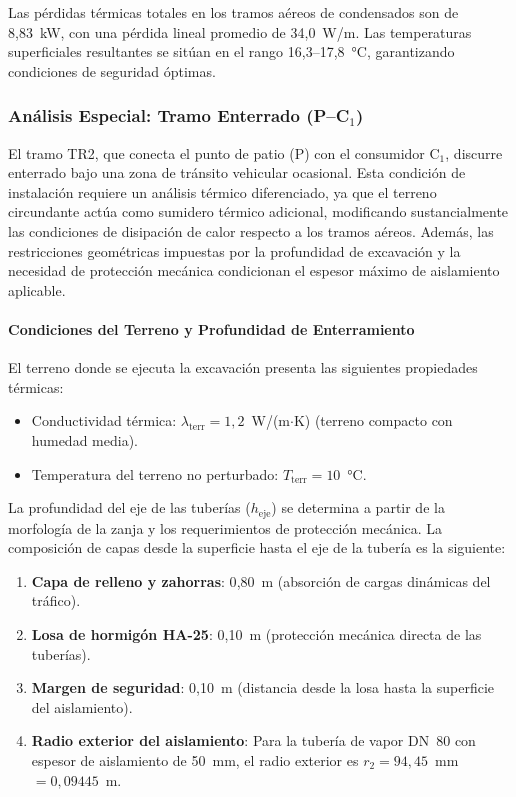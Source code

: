 Las pérdidas térmicas totales en los tramos aéreos de condensados son de 8{,}83~kW, con una pérdida lineal promedio de 34{,}0~W/m. Las temperaturas superficiales resultantes se sitúan en el rango 16{,}3--17{,}8~°C, garantizando condiciones de seguridad óptimas.


\subsubsection{Análisis Especial: Tramo Enterrado (P--C$_1$)}
\label{subsubsec:tramo_enterrado}

El tramo TR2, que conecta el punto de patio (P) con el consumidor C$_1$, discurre enterrado bajo una zona de tránsito vehicular ocasional. Esta condición de instalación requiere un análisis térmico diferenciado, ya que el terreno circundante actúa como sumidero térmico adicional, modificando sustancialmente las condiciones de disipación de calor respecto a los tramos aéreos. Además, las restricciones geométricas impuestas por la profundidad de excavación y la necesidad de protección mecánica condicionan el espesor máximo de aislamiento aplicable.

\paragraph{Condiciones del Terreno y Profundidad de Enterramiento}
\label{par:condiciones_terreno}

El terreno donde se ejecuta la excavación presenta las siguientes propiedades térmicas:

\begin{itemize}[noitemsep]
	\item Conductividad térmica: $\lambda_{\text{terr}} = 1{,}2$~W/(m$\cdot$K) (terreno compacto con humedad media).
	\item Temperatura del terreno no perturbado: $T_{\text{terr}} = 10$~°C.
\end{itemize}

La profundidad del eje de las tuberías ($h_{\text{eje}}$) se determina a partir de la morfología de la zanja y los requerimientos de protección mecánica. La composición de capas desde la superficie hasta el eje de la tubería es la siguiente:

\begin{enumerate}[noitemsep]
	\item \textbf{Capa de relleno y zahorras}: 0{,}80~m (absorción de cargas dinámicas del tráfico).
	\item \textbf{Losa de hormigón HA-25}: 0{,}10~m (protección mecánica directa de las tuberías).
	\item \textbf{Margen de seguridad}: 0{,}10~m (distancia desde la losa hasta la superficie del aislamiento).
	\item \textbf{Radio exterior del aislamiento}: Para la tubería de vapor DN~80 con espesor de aislamiento de 50~mm, el radio exterior es $r_2 = 94{,}45$~mm $= 0{,}09445$~m.
\end{enumerate}

